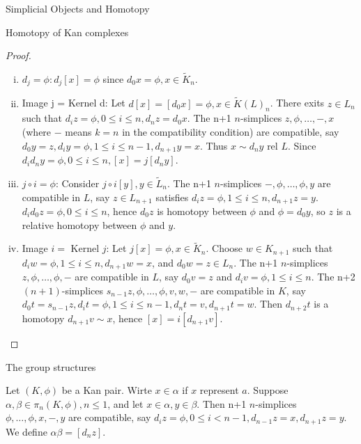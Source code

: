 \documentclass[a4,20pt,twosides]{book}
\begin{document}
\begin{chapter}{Simplicial Objects and Homotopy}
\begin{section}{Homotopy of Kan complexes}
\begin{proof}
\begin{enumerate}[(i)]
			\item $d_j = \phi: d_{j}[x] = \phi$ since $d_0 x = \phi, x \in \tilde{K}_n$.
			\item Image j = Kernel d: Let $d[x] = [d_0 x] = \phi, x \in \tilde{K}(L)_n$. There exits $z \in L_n$ such that $d_i z = \phi, 0 \leq i \leq n, d_n z = d_0 x$. The n+1 $n$-simplices $z, \phi, \dots, -,x$ (where $-$ means $k=n$ in the compatibility condition) are compatible, say $d_0 y = z, d_i y = \phi, 1 \leq i \leq n-1, d_{n+1} y =x$. Thus $x \sim d_n y \text{ rel } L$. Since $d_i d_n y = \phi , 0 \leq i \leq n, [x] = j[d_n y]$.
			\item $j \circ i = \phi$: Consider $j \circ i [y], y \in \tilde{L}_n$. The n+1 $n$-simplices $-, \phi, \dots, \phi, y$ are compatible in $L$, say $z \in L_{n+1}$ satisfies $d_i z = \phi, 1 \leq i \leq n, d_{n+1} z = y$. $d_i d_0 z = \phi, 0 \leq i \leq n$, hence $d_0 z$ is homotopy between $\phi$ and $\phi = d_0 y$, so $z$ is a relative homotopy between $\phi$ and $y$.
			\item Image $i=$ Kernel $j$: Let $j[x] =\phi, x \in \tilde{K}_n$. Choose $w \in K_{n+1}$ such that $d_i w = \phi , 1 \leq i \leq n, d_{n+1}w =x$, and  $d_0 w = z \in L_n$. The n+1 $n$-simplices $z, \phi, \dots, \phi, -$ are compatible in $L$, say $d_0 v = z$ and $d_i v = \phi, 1 \leq i \leq n$. The n+2 $(n+1)$-simplices $s_{n-1}z, \phi, \dots, \phi, v,w,-$ are compatible in $K$, say $d_0 t = s_{n-1}z, d_i t = \phi, 1 \leq i \leq n-1, d_n t =v , d_{n+1}t = w$. Then $d_{n+2}t$ is a homotopy $d_{n+1} v \sim x$, hence $[x]= i[d_{n+1}v]$.
		\end{enumerate}
	\end{proof}
\end{section}

\begin{section}{The group structures}
	\begin{chdefn}
		Let $(K, \phi)$ be a Kan pair. Wirte $x \in \alpha$ if $x$ represent $a$. Suppose $\alpha, \beta \in \pi_n(K,\phi), n \leq 1$, and let $ x \in \alpha, y \in \beta$. Then n+1 $n$-simplices $\phi, \dots , \phi, x , -, y$ are compatible, say $d_i z = \phi, 0 \leq i < n-1, d_{n-1} z = x, d_{n+1} z = y$. We define $\alpha \beta = [d_n z]$.  
	\end{chdefn}
	

\end{section}
\end{chapter}
\end{document}
